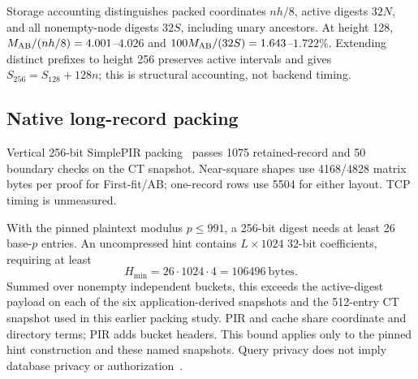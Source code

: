 Storage accounting distinguishes packed coordinates $nh/8$, active digests $32N$, and all nonempty-node digests $32S$, including unary ancestors. At height 128, $M_{\rm AB}/(nh/8)=4.001$--$4.026$ and $100M_{\rm AB}/(32S)=1.643$--$1.722\%$. Extending distinct prefixes to height 256 preserves active intervals and gives $S_{256}=S_{128}+128n$; this is structural accounting, not backend timing.

\subsection{Native long-record packing}
\label{sec:followup-packing}

Vertical 256-bit SimplePIR packing~\cite{simplepir} passes 1075 retained-record and 50 boundary checks on the CT snapshot. Near-square shapes use 4168/4828 matrix bytes per proof for First-fit/AB; one-record rows use 5504 for either layout. TCP timing is unmeasured.

With the pinned plaintext modulus $p\le991$, a 256-bit digest needs at least 26 base-$p$ entries. An uncompressed hint contains $L\times1024$ 32-bit coefficients, requiring at least
\begin{equation}
H_{\min}=26\cdot1024\cdot4=106496\ \text{bytes}.
\label{eq:native-hint-floor}
\end{equation}
Summed over nonempty independent buckets, this exceeds the active-digest payload on each of the six application-derived snapshots and the 512-entry CT snapshot used in this earlier packing study. PIR and cache share coordinate and directory terms; PIR adds bucket headers. This bound applies only to the pinned hint construction and these named snapshots. Query privacy does not imply database privacy or authorization~\cite{spirprivacy}.

